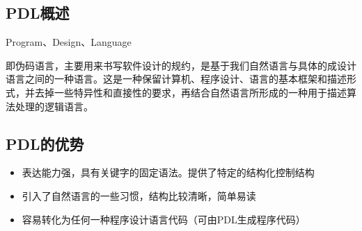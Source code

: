 \documentclass[AutoFakeBold]{LZUThesis2007}
\begin{document}
		\subsection{PDL概述}

			Program、Design、Language

			即伪码语言，主要用来书写软件设计的规约，是基于我们自然语言与具体的成设计语言之间的一种语言。这是一种保留计算机、程序设计、语言的基本框架和描述形式，并去掉一些特异性和直接性的要求，再结合自然语言所形成的一种用于描述算法处理的逻辑语言。

		\subsection{PDL的优势}
			\begin{itemize}
				\item 表达能力强，具有关键字的固定语法。提供了特定的结构化控制结构
				\item 引入了自然语言的一些习惯，结构比较清晰，简单易读
				\item 容易转化为任何一种程序设计语言代码（可由PDL生成程序代码）
			\end{itemize}
\end{document}
